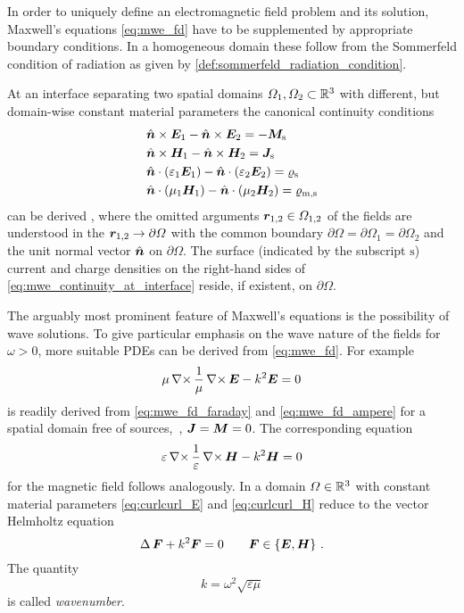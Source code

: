 In order to uniquely define an electromagnetic field problem and its solution,
Maxwell's equations \eqref{eq:mwe_fd} have to be supplemented by appropriate
boundary conditions.
In a homogeneous domain these follow from the Sommerfeld condition of radiation
as given by \cref{def:sommerfeld_radiation_condition}.

At an interface separating two spatial domains $\Omega_1, \Omega_2 \subset \mathbb{R}^3$
with different, but domain-wise constant material parameters the canonical
continuity conditions
\begin{subequations}\label{eq:mwe_continuity_at_interface}
	\begin{align}
		&\uv{n} \times \pvec{E}_1 - \uv{n} \times \pvec{E}_2 =
		- \pvec{M}_\mathrm{s} \\
		&\uv{n} \times \pvec{H}_1 - \uv{n} \times \pvec{H}_2 =
		\pvec{J}_\mathrm{s} \\
		&\uv{n} \cdot \left(\varepsilon_1 \pvec{E}_1\right) -
		\uv{n} \cdot \left(\varepsilon_2 \pvec{E}_2\right) = 
		\varrho_\mathrm{s} \\
		&\uv{n} \cdot \left(\mu_1 \pvec{H}_1\right) -
		\uv{n} \cdot \left(\mu_2 \pvec{H}_2\right) = 
		\varrho_\mathrm{m,s}
	\end{align}
\end{subequations}
can be derived \cite[p20]{Jackson2013}, where the omitted arguments
$\robs_{1,2} \in \Omega_{1,2}$ of the fields are understood in the
$\robs_{1,2} \to \partial \Omega$ with the common boundary
$\partial \Omega = \partial \Omega_1 = \partial \Omega_2$ and the unit normal
vector $\uv{n}$ on $\partial \Omega$.
The surface (indicated by the subscript $\mathrm{s}$) current and charge
densities on the right-hand sides of \eqref{eq:mwe_continuity_at_interface}
reside, if existent, on $\partial\Omega$.

The arguably most prominent feature of Maxwell's equations is the possibility
of wave solutions.
To give particular emphasis on the wave nature of the fields for $\omega > 0$,
more suitable \acp{PDE} can be derived from \eqref{eq:mwe_fd}.
For example
\begin{equation}\label{eq:curlcurl_E}
	\mu\curl\frac{1}{\mu}\curl\pvec{E} - k^2\pvec{E} = 0 
\end{equation}
is readily derived from \eqref{eq:mwe_fd_faraday} and \eqref{eq:mwe_fd_ampere}
for a spatial domain free of sources,~\ie, $\pvec{J} = \pvec{M} = 0$.
The corresponding equation
\begin{equation}\label{eq:curlcurl_H}
	\varepsilon\curl\frac{1}{\varepsilon}\curl\pvec{H} - k^2\pvec{H} = 0
\end{equation}
for the magnetic field follows analogously.
In a domain $\Omega \in \mathbb{R}^3$ with constant material parameters
\eqref{eq:curlcurl_E} and \eqref{eq:curlcurl_H} reduce to the vector Helmholtz
equation
\begin{equation}\label{eq:vector_helmholtz_equation}
	\laplace \pvec{F} + k^2 \pvec{F} = 0 \qquad
	\pvec{F} \in \left\{\pvec{E}, \pvec{H}\right\}
	\, .
\end{equation}
The quantity
\begin{equation}\label{eq:wavenumber}
	k = \omega^2 \sqrt{\varepsilon \mu}
\end{equation}
is called \emph{wavenumber}.

